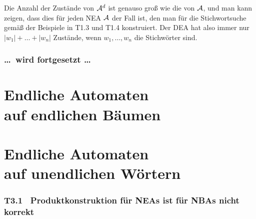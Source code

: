 \documentclass[fontsize=11pt, twoside=false, numbers=autoenddot]{scrbook}
\begin{document}
Die Anzahl der Zustände von $\mathcal{A}^d$ ist genauso groß wie die von $\mathcal{A}$,
und man kann zeigen, dass dies für jeden NEA $\mathcal{A}$ der Fall ist,
den man für die Stichwortsuche gemäß der Beispiele in T1.3 und T1.4 konstruiert.
Der DEA hat also immer nur $|w_1| + \dots + |w_n|$ Zustände,
wenn $w_1,\dots,w_n$ die Stichwörter sind.

\parIII
\section*{\dots\ wird fortgesetzt \dots}

\part[Endliche Automaten auf endlichen Bäumen]{Endliche Automaten \\ auf endlichen Bäumen}


\part[Endliche Automaten auf unendlichen Wörtern]{Endliche Automaten \\ auf unendlichen Wörtern}

\section*{T3.1~ Produktkonstruktion für NEAs ist für NBAs nicht korrekt}
\end{document}
